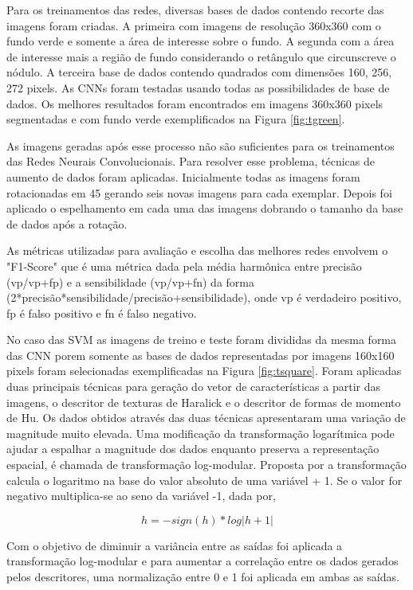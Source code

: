 \documentclass[12pt]{article}
\begin{document}
Para os treinamentos das redes, diversas bases de dados contendo recorte das imagens foram criadas. A primeira com imagens de resolução 360x360 com o fundo verde e somente a área de interesse sobre o fundo. A segunda com a área de interesse mais a região de fundo considerando o retângulo que circunscreve o nódulo. A terceira base de dados contendo quadrados com dimensões 160, 256, 272 pixels. As CNNs foram testadas usando todas as possibilidades de base de dados. Os melhores resultados foram encontrados em imagens 360x360 pixels segmentadas e com fundo verde exemplificados na Figura \ref{fig:tgreen}.

As imagens geradas após esse processo não são suficientes para os treinamentos das Redes Neurais Convolucionais. Para resolver esse problema, técnicas de aumento de dados foram aplicadas. Inicialmente todas as imagens foram rotacionadas em 45\textdegree{} gerando seis novas imagens para cada exemplar. Depois foi aplicado o espelhamento em cada uma das imagens dobrando o tamanho da base de dados após a rotação.

As métricas utilizadas para avaliação e escolha das melhores redes envolvem o "F1-Score" que é uma métrica dada pela média harmônica entre precisão (vp/vp+fp) e a sensibilidade (vp/vp+fn) da forma (2*precisão*sensibilidade/precisão+sensibilidade), onde vp é verdadeiro positivo, fp é falso positivo e fn é falso negativo.

No caso das SVM as imagens de treino e teste foram divididas da mesma forma das CNN porem somente as bases de dados representadas por imagens 160x160 pixels foram selecionadas exemplificadas na Figura \ref{fig:tsquare}. Foram aplicadas duas principais técnicas para geração do vetor de características a partir das imagens, o descritor de texturas de Haralick e o descritor de formas de momento de Hu. Os dados obtidos através das duas técnicas apresentaram uma variação de magnitude muito elevada. Uma modificação da transformação logarítmica pode ajudar a espalhar a magnitude dos dados enquanto preserva a representação espacial, é chamada de transformação log-modular. Proposta por \cite{JohnDraper} a transformação calcula o logaritmo na base do valor absoluto de uma variável + 1. Se o valor for negativo multiplica-se ao seno da variável -1, dada por,

\[ h=-sign(h)*log|h+1| \]

Com o objetivo de diminuir a variância entre as saídas foi aplicada a transformação log-modular e para aumentar a correlação entre os dados gerados pelos descritores, uma normalização entre 0 e 1 foi aplicada em ambas as saídas.
\end{document}
